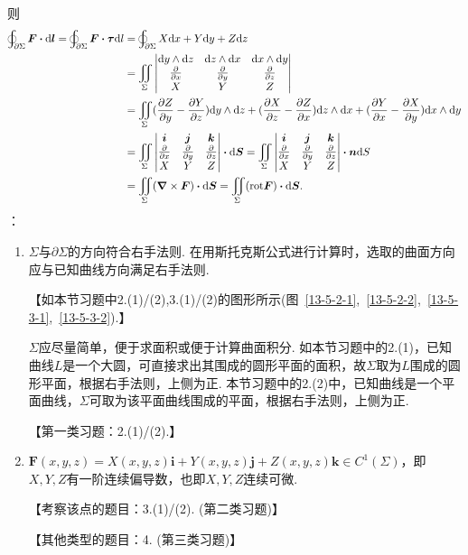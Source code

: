 \documentclass[12pt,UTF8]{ctexart}
\newcommand{\BLOInt}[2]{\varoint\nolimits_{#1}#2}
\newcommand{\md}[1]{\mathrm d#1}
\newcommand{\BSIInt}[2]{\iint\limits_{#1}#2}
\newcommand{\pp}[2]{\frac{\partial #1}{\partial #2}}
\newcommand{\ppx}[1]{\frac{\partial #1}{\partial x}}
\newcommand{\ppy}[1]{\frac{\partial #1}{\partial y}}
\newcommand{\ppz}[1]{\frac{\partial #1}{\partial z}}
\begin{document}
\begin{enumerate}
则
\[\begin{aligned}
\BLOInt{\partial\Sigma}{\bm F\bm\cdot\md\bm l}=\BLOInt{\partial\Sigma}{\bm F\bm\cdot\bm\tau\md l}&=\BLOInt{\partial\Sigma}{X\md x+Y\md y+Z\md z}\\
&=\BSIInt\Sigma{\begin{vmatrix}
\md y\wedge\md z&\md z\wedge\md x&\md x\wedge\md y\\
\ppx{}&\ppy{}&\ppz{}\\
X&Y&Z
\end{vmatrix}}\\
&=\BSIInt\Sigma{(\pp Zy-\pp Yz)\md y\wedge\md z+(\pp Xz-\pp Zx)\md z\wedge\md x+(\pp Yx-\pp Xy)\md x\wedge\md y}\\
&=\BSIInt\Sigma{\begin{vmatrix}
\bm i&\bm j&\bm k\\
\ppx{}&\ppy{}&\ppz{}\\
X&Y&Z
\end{vmatrix}\bm\cdot\md\bm S}=\BSIInt\Sigma{\begin{vmatrix}
\bm i&\bm j&\bm k\\
\ppx{}&\ppy{}&\ppz{}\\
X&Y&Z
\end{vmatrix}\bm\cdot\bm n\md S}\\
&=\BSIInt\Sigma{(\bm\nabla\times\bm F)\bm\cdot\md\bm S}=\BSIInt\Sigma{(\text{rot}\bm F)\bm\cdot\md\bm S}.
\end{aligned}\]
{：}
\begin{enumerate}
\item$\Sigma$与$\partial\Sigma$的方向符合右手法则. 在用斯托克斯公式进行计算时，选取的曲面方向应与已知曲线方向满足右手法则.

【如本节习题中2.(1)/(2),3.(1)/(2)的图形所示(图~\ref{13-5-2-1},~\ref{13-5-2-2},~\ref{13-5-3-1},~\ref{13-5-3-2}).】

$\Sigma$应尽量简单，便于求面积或便于计算曲面积分. 如本节习题中的2.(1)，已知曲线$L$是一个大圆，可直接求出其围成的圆形平面的面积，故$\Sigma$取为$L$围成的圆形平面，根据右手法则，上侧为正. 本节习题中的2.(2)中，已知曲线是一个平面曲线，$\Sigma$可取为该平面曲线围成的平面，根据右手法则，上侧为正.

【第一类习题：2.(1)/(2).】
\item$\bm F(x,y,z)=X(x,y,z)\bm i+Y(x,y,z)\bm j+Z(x,y,z)\bm k\in C^1(\Sigma)$，即$X,Y,Z$有一阶连续偏导数，也即$X,Y,Z$连续可微.

【考察该点的题目：3.(1)/(2). (第二类习题)】

【其他类型的题目：4. (第三类习题)】
\end{enumerate}
\end{enumerate}
\end{document}
